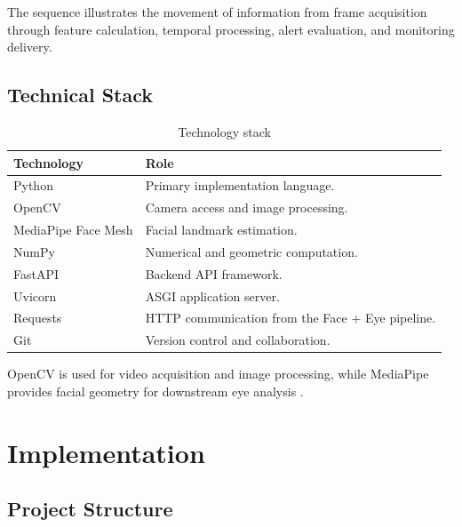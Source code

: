 \documentclass{tietreport}
\begin{document}
The sequence illustrates the movement of information from frame
acquisition through feature calculation, temporal processing, alert
evaluation, and monitoring delivery.


\section{Technical Stack}

\begin{table}[H]
\centering
\caption{Technology stack}
\label{tab:stack}

\begin{tabularx}{0.94\textwidth}{@{}P{3.3cm}Y@{}}

\toprule
\textbf{Technology} & \textbf{Role}\\
\midrule

Python & Primary implementation language.\\
OpenCV & Camera access and image processing.\\
MediaPipe Face Mesh & Facial landmark estimation.\\
NumPy & Numerical and geometric computation.\\
FastAPI & Backend API framework.\\
Uvicorn & ASGI application server.\\
Requests & HTTP communication from the Face + Eye pipeline.\\
Git & Version control and collaboration.\\

\bottomrule

\end{tabularx}
\end{table}

OpenCV is used for video acquisition and image processing, while
MediaPipe provides facial geometry for downstream eye analysis
\cite{KAGG19,Ope26,Goo26}.


\chapter{Implementation}

\section{Project Structure}
\end{document}
